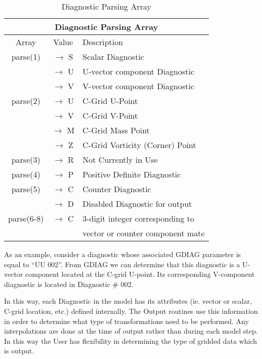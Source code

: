 \begin{table}
\caption{Diagnostic Parsing Array}
\label{tab:diagnostics:gdiag.tabl}
\begin{center}
\begin{tabular}{ |c|c|l| }
\hline
\multicolumn{3}{|c|}{\bf Diagnostic Parsing Array} \\ 
\hline
\hline
Array & Value & Description \\
\hline
  parse(1)   & $\rightarrow$ S &  Scalar Diagnostic                 \\ 
             & $\rightarrow$ U &  U-vector component Diagnostic     \\ 
             & $\rightarrow$ V &  V-vector component Diagnostic     \\ \hline
  parse(2)   & $\rightarrow$ U &  C-Grid U-Point                    \\ 
             & $\rightarrow$ V &  C-Grid V-Point                    \\ 
             & $\rightarrow$ M &  C-Grid Mass Point                 \\ 
             & $\rightarrow$ Z &  C-Grid Vorticity (Corner) Point   \\ \hline
  parse(3)   & $\rightarrow$ R &  Not Currently in Use              \\ \hline
  parse(4)   & $\rightarrow$ P &  Positive Definite Diagnostic      \\ \hline
  parse(5)   & $\rightarrow$ C &  Counter Diagnostic                \\
             & $\rightarrow$ D &  Disabled Diagnostic for output    \\ \hline
  parse(6-8) & $\rightarrow$ C &  3-digit integer corresponding to  \\
             &                 &  vector or counter component mate  \\ \hline
\end{tabular}
\end{center}
\end{table}


\noindent
As an example, consider a diagnostic whose associated GDIAG parameter is equal
to ``UU  002''.  From GDIAG we can determine that this diagnostic is a 
U-vector component located at the C-grid U-point.
Its corresponding V-component diagnostic is located in Diagnostic \# 002.

\noindent
In this way, each Diagnostic in the model has its attributes (ie. vector or scalar,
C-grid location, etc.) defined internally.  The Output routines use this information 
in order to determine what type of transformations need to be performed.  Any 
interpolations are done at the time of output rather than during each model step.
In this way the User has flexibility in determining the type of gridded data which 
is output.

